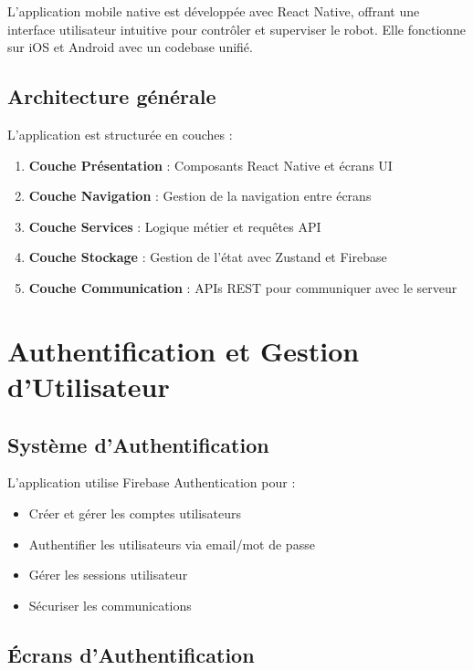 \documentclass[12pt,a4paper,oneside]{report}
\begin{document}
L'application mobile native est développée avec React Native, offrant une interface utilisateur intuitive pour contrôler et superviser le robot. Elle fonctionne sur iOS et Android avec un codebase unifié.

\subsection{Architecture générale}

L'application est structurée en couches :

\begin{enumerate}
  \item \textbf{Couche Présentation} : Composants React Native et écrans UI
  \item \textbf{Couche Navigation} : Gestion de la navigation entre écrans
  \item \textbf{Couche Services} : Logique métier et requêtes API
  \item \textbf{Couche Stockage} : Gestion de l'état avec Zustand et Firebase
  \item \textbf{Couche Communication} : APIs REST pour communiquer avec le serveur
\end{enumerate}

\section{Authentification et Gestion d'Utilisateur}

\subsection{Système d'Authentification}

L'application utilise Firebase Authentication pour :

\begin{itemize}
  \item Créer et gérer les comptes utilisateurs
  \item Authentifier les utilisateurs via email/mot de passe
  \item Gérer les sessions utilisateur
  \item Sécuriser les communications
\end{itemize}

\subsection{Écrans d'Authentification}
\end{document}
